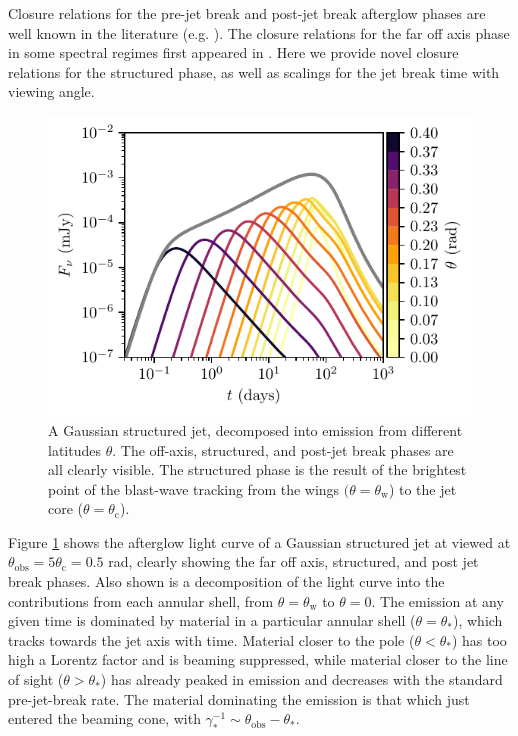 \documentclass[twocolumn]{aastex62}
\newcommand{\thobs}{\ensuremath{\theta_{\mathrm{obs}}}}
\newcommand{\thW}{\ensuremath{\theta_{\mathrm{w}}}}
\newcommand{\thC}{\ensuremath{\theta_{\mathrm{c}}}}
\begin{document}
Closure relations for the pre-jet break and post-jet break afterglow phases are well known in the literature (e.g. \citet{Granot:2002aa, Rhoads:1999aa}).  The closure relations for the far off axis phase in some spectral regimes first appeared in \citet{Salmonson:2003aa}.  Here we provide novel closure relations for the structured phase, as well as scalings for the jet break time with viewing angle.

\begin{figure}
	\includegraphics[width=\columnwidth]{figs/lc_decomp.pdf}
	\caption{A Gaussian structured jet, decomposed into emission from different latitudes $\theta$.  The off-axis, structured, and post-jet break phases are all clearly visible.  The structured phase is the result of the brightest point of the blast-wave tracking from the wings $(\theta =\thW$) to the jet core ($\theta=\thC$). \label{fig:decomp}}
\end{figure}

Figure \ref{fig:decomp} shows the afterglow light curve of a Gaussian structured jet at viewed at $\thobs = 5 \thC = 0.5$ rad, clearly showing the far off axis, structured, and post jet break phases.  Also shown is a decomposition of the light curve into the contributions from each annular shell, from $\theta =\thW$ to $\theta = 0$.  The emission at any given time is dominated by material in a particular annular shell ($\theta = \theta_*$), which tracks towards the jet axis with time.  Material closer to the pole ($\theta < \theta_*$) has too high a Lorentz factor and is beaming suppressed, while material closer to the line of sight ($\theta > \theta_*$) has already peaked in emission and decreases with the standard pre-jet-break rate.  The material dominating the emission is that which just entered the beaming cone, with $\gamma_*^{-1} \sim \thobs-\theta_*$.
\end{document}
